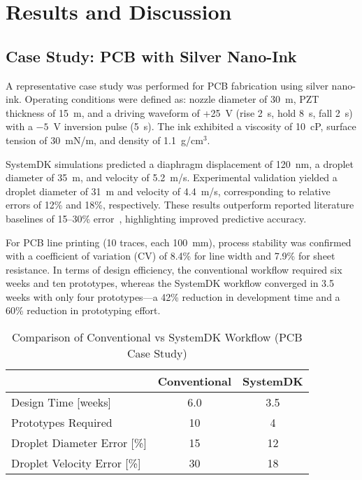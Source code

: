 \documentclass[conference]{IEEEtran}
\begin{document}
\section{Results and Discussion}
\subsection{Case Study: PCB with Silver Nano-Ink}
A representative case study was performed for PCB fabrication using silver nano-ink.  
Operating conditions were defined as: nozzle diameter of 30~\textmu m, PZT thickness of 15~\textmu m, and a driving waveform of +25~V (rise 2~\textmu s, hold 8~\textmu s, fall 2~\textmu s) with a $-5$~V inversion pulse (5~\textmu s).  
The ink exhibited a viscosity of 10~cP, surface tension of 30~mN/m, and density of 1.1~g/cm$^3$.

SystemDK simulations predicted a diaphragm displacement of 120~nm, a droplet diameter of 35~\textmu m, and velocity of 5.2~m/s.  
Experimental validation yielded a droplet diameter of 31~\textmu m and velocity of 4.4~m/s, corresponding to relative errors of 12\% and 18\%, respectively.  
These results outperform reported literature baselines of 15--30\% error~\cite{boccio2003,lei2012}, highlighting improved predictive accuracy.

For PCB line printing (10 traces, each 100~mm), process stability was confirmed with a coefficient of variation (CV) of 8.4\% for line width and 7.9\% for sheet resistance.  
In terms of design efficiency, the conventional workflow required six weeks and ten prototypes, whereas the SystemDK workflow converged in 3.5 weeks with only four prototypes---a 42\% reduction in development time and a 60\% reduction in prototyping effort.

\begin{table}[t]
\centering
\caption{Comparison of Conventional vs SystemDK Workflow (PCB Case Study)}
\begin{tabular}{lcc}
\toprule
 & Conventional & SystemDK \\
\midrule
Design Time [weeks] & 6.0 & 3.5 \\
Prototypes Required & 10  & 4   \\
Droplet Diameter Error [\%] & 15 & 12 \\
Droplet Velocity Error [\%] & 30 & 18 \\
\bottomrule
\end{tabular}
\label{tab:comparison}
\end{table}
\end{document}
